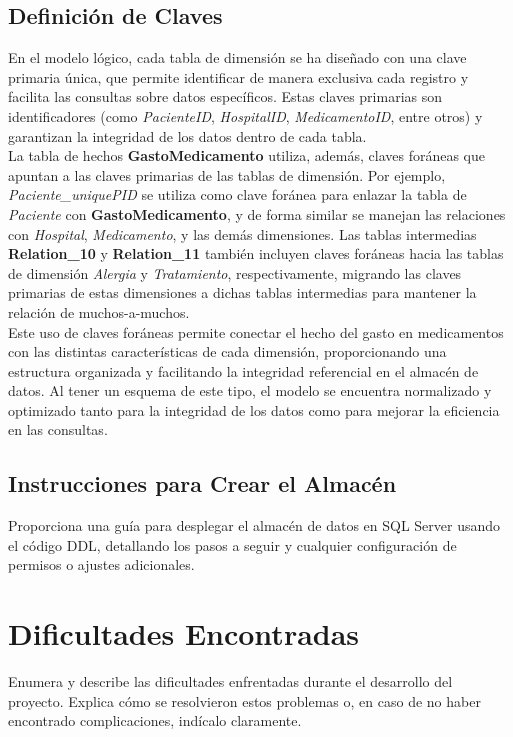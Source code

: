 \documentclass{article}
\begin{document}
\subsection{Definición de Claves}
En el modelo lógico, cada tabla de dimensión se ha diseñado con una clave primaria única, que permite identificar de manera exclusiva cada registro y facilita las consultas sobre datos específicos. Estas claves primarias son identificadores (como \textit{PacienteID}, \textit{HospitalID}, \textit{MedicamentoID}, entre otros) y garantizan la integridad de los datos dentro de cada tabla.
\\

La tabla de hechos \textbf{GastoMedicamento} utiliza, además, claves foráneas que apuntan a las claves primarias de las tablas de dimensión. Por ejemplo, \textit{Paciente\_uniquePID} se utiliza como clave foránea para enlazar la tabla de \textit{Paciente} con \textbf{GastoMedicamento}, y de forma similar se manejan las relaciones con \textit{Hospital}, \textit{Medicamento}, y las demás dimensiones. Las tablas intermedias \textbf{Relation\_10} y \textbf{Relation\_11} también incluyen claves foráneas hacia las tablas de dimensión \textit{Alergia} y \textit{Tratamiento}, respectivamente, migrando las claves primarias de estas dimensiones a dichas tablas intermedias para mantener la relación de muchos-a-muchos.
\\

Este uso de claves foráneas permite conectar el hecho del gasto en medicamentos con las distintas características de cada dimensión, proporcionando una estructura organizada y facilitando la integridad referencial en el almacén de datos. Al tener un esquema de este tipo, el modelo se encuentra normalizado y optimizado tanto para la integridad de los datos como para mejorar la eficiencia en las consultas.

\subsection{Instrucciones para Crear el Almacén}
Proporciona una guía para desplegar el almacén de datos en SQL Server usando el código DDL, detallando los pasos a seguir y cualquier configuración de permisos o ajustes adicionales.

\section{Dificultades Encontradas}
\label{sec:dificultades_encontradas}
Enumera y describe las dificultades enfrentadas durante el desarrollo del proyecto. Explica cómo se resolvieron estos problemas o, en caso de no haber encontrado complicaciones, indícalo claramente.
\end{document}
